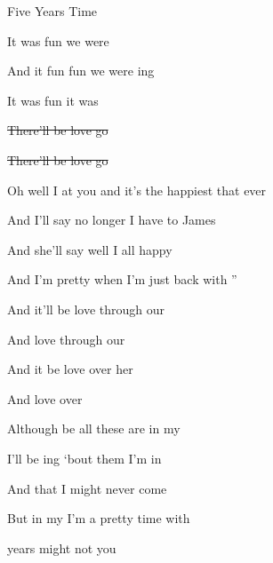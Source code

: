 \begin{SBSong}{Five Years Time}
\begin{SBChorus}
    It was  fun   we were 
    
    And it  fun fun   we were ing
    
    It was  fun   it was 
  \end{SBChorus}
  \begin{SBVerse*}
    
    \sout{There'll be  love    go}
    
    \sout{There'll be  love    go}
  \end{SBVerse*}
  \CBPageBrk
  \begin{SBVerse}
    Oh well I  at you and  it's the happiest that  ever 
    
    And I'll say  no longer  I have to  James 
    
    And she'll say  well I  all  happy 
    
    And I'm  pretty  when I'm just  back with ''
  \end{SBVerse}
  \begin{SBChorus}
    And it'll be  love   through our 
    
    And  love   through our 
    
    And it be  love   over her 
    
    And  love   over 
  \end{SBChorus}
  \WBPageBrk
  \begin{SBVerse}
    Although be all these  are  in my 
    
    I'll be ing `bout them  I'm  in 
    
    And  that I  might never  come 
    
    But in my  I'm  a pretty  time with 
  \end{SBVerse}
  \begin{SBChorus}
     years   might not  you
    

\end{SBChorus}
\end{SBSong}
